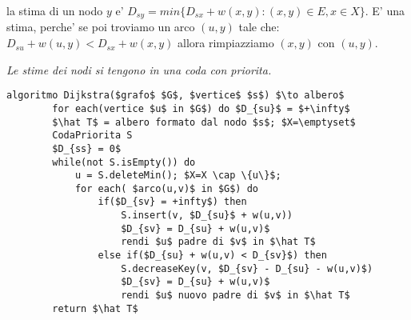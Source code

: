 la stima di un nodo $y$ e' $D_{sy} = min\{D_{sx} + w(x,y) : (x,y) \in E, x \in X\}$. 
E' una stima, perche' se poi troviamo un arco $(u,y)$ tale che: $D_{su} + w(u,y) < D_{sx} + w(x,y)$ allora
rimpiazziamo $(x,y)$ con $(u,y)$.

\textit{Le stime dei nodi si tengono in una coda con priorita.}

\begin{lstlisting}[mathescape=true]
    algoritmo Dijkstra($grafo$ $G$, $vertice$ $s$) $\to albero$
        for each(vertice $u$ in $G$) do $D_{su}$ = $+\infty$
        $\hat T$ = albero formato dal nodo $s$; $X=\emptyset$
        CodaPriorita S
        $D_{ss} = 0$
        while(not S.isEmpty()) do
            u = S.deleteMin(); $X=X \cap \{u\}$;
            for each( $arco(u,v)$ in $G$) do
                if($D_{sv} = +infty$) then
                    S.insert(v, $D_{su}$ + w(u,v))
                    $D_{sv} = D_{su} + w(u,v)$
                    rendi $u$ padre di $v$ in $\hat T$
                else if($D_{su} + w(u,v) < D_{sv}$) then
                    S.decreaseKey(v, $D_{sv} - D_{su} - w(u,v)$)
                    $D_{sv} = D_{su} + w(u,v)$
                    rendi $u$ nuovo padre di $v$ in $\hat T$
        return $\hat T$
\end{lstlisting}